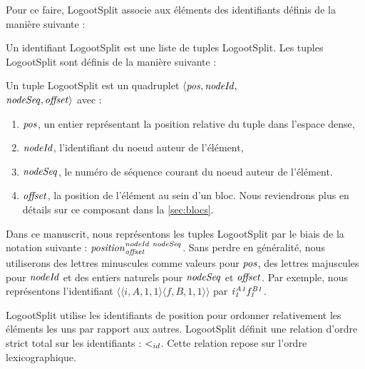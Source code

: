 Pour ce faire, LogootSplit associe aux éléments des identifiants définis de la manière suivante :

\begin{definition}
  Un identifiant LogootSplit est une liste de tuples LogootSplit.
  Les tuples LogootSplit sont définis de la manière suivante :
  \begin{subdefinition}
    Un tuple LogootSplit est un quadruplet $\langle \mathit{pos},\mathit{nodeId},$ \\
    $\mathit{nodeSeq},\mathit{offset} \rangle$ avec :
    \begin{enumerate}
      \item $\mathit{pos}$, un entier représentant la position relative du tuple dans l'espace dense,
      \item $\mathit{nodeId}$, l'identifiant du noeud auteur de l'élément,
      \item $\mathit{nodeSeq}$, le numéro de séquence courant du noeud auteur de l'élément.
      \item $\mathit{offset}$, la position de l'élément au sein d'un bloc. Nous reviendrons plus en détails sur ce composant dans la \autoref{sec:blocs}.
    \end{enumerate}
  \end{subdefinition}
\end{definition}

Dans ce manuscrit, nous représentons les tuples LogootSplit par le biais de la notation suivante : $\mathit{position}^{\mathit{nodeId~nodeSeq}}_{\mathit{offset}}$.
Sans perdre en généralité, nous utiliserons des lettres minuscules comme valeurs pour $\mathit{pos}$, des lettres majuscules pour $\mathit{nodeId}$ et des entiers naturels pour $\mathit{nodeSeq}$ et $\mathit{offset}$.
Par exemple, nous représentons l'identifiant $\langle \langle i,A,1,1 \rangle \langle f,B,1,1 \rangle \rangle$ par $\mathit{i}^{\mathit{A1}}_{\mathit{1}}\mathit{f}^{\mathit{B1}}_{\mathit{1}}$.

LogootSplit utilise les identifiants de position pour ordonner relativement les éléments les uns par rapport aux autres.
LogootSplit définit une relation d'ordre strict total sur les identifiants : $<_{id}$.
Cette relation repose sur l'ordre lexicographique.

